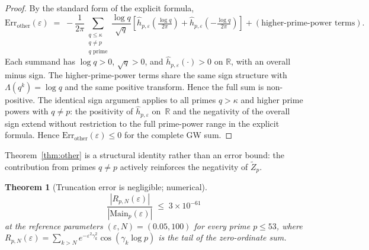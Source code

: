 \documentclass[11pt]{article}
\newtheorem{theorem}{Theorem}[section]
\begin{document}
\begin{proof}
By the standard form of the explicit formula,
\[
\mathrm{Err}_{\mathrm{other}}(\varepsilon) \;=\; -\frac{1}{2\pi}
\sum_{\substack{q\le\kappa\\ q\neq p\\ q\text{ prime}}}
\frac{\log q}{\sqrt q}
\!\left[\widehat{h}_{p,\varepsilon}\!\left(\tfrac{\log q}{2\pi}\right)
      +\widehat{h}_{p,\varepsilon}\!\left(-\tfrac{\log q}{2\pi}\right)
\right]
+ (\text{higher-prime-power terms}).
\]
Each summand has $\log q>0$, $\sqrt q>0$, and
$\widehat{h}_{p,\varepsilon}(\cdot)>0$ on $\mathbb R$, with an overall
minus sign.
The higher-prime-power terms share the same sign structure with
$\Lambda(q^k)=\log q$ and the same positive transform.
Hence the full sum is non-positive.
The identical sign argument applies to all primes $q>\kappa$ and
higher prime powers with $q\neq p$: the positivity of
$\widehat h_{p,\varepsilon}$ on~$\mathbb R$ and the negativity of
the overall sign extend without restriction to the full prime-power range
in the explicit formula.
Hence $\mathrm{Err}_{\mathrm{other}}(\varepsilon)\le 0$ for the
complete GW sum.
\end{proof}

Theorem~\ref{thm:other} is a structural identity rather than an error
bound: the contribution from primes $q\neq p$ actively reinforces the
negativity of $\widetilde Z_p$.

\begin{theorem}[Truncation error is negligible; numerical]
\label{thm:trunc}
\[
\frac{|R_{p,N}(\varepsilon)|}{|\mathrm{Main}_p(\varepsilon)|}
\;\le\; 3\times 10^{-61}
\]
at the reference parameters $(\varepsilon,N)=(0.05,100)$ for every
prime $p\le 53$, where $R_{p,N}(\varepsilon)=\sum_{k>N}
e^{-\varepsilon^2\gamma_k^2}\cos(\gamma_k\log p)$ is the tail of the
zero-ordinate sum.
\end{theorem}
\end{document}
